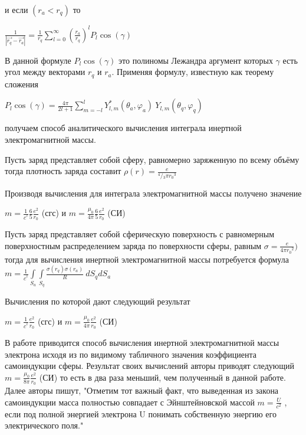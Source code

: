 \documentclass{article}
\begin{document}
и если $\left( {{r}_{a}}<{{r}_{q}} \right)$ то

$\frac{1}{\left| \overrightarrow{{{r}_{q}}}-\overrightarrow{{{r}_{a}}} \right|}=\frac{1}{{{r}_{q}}}\sum\limits_{l=0}^{\infty }{{{\left( \frac{{{r}_{a}}}{{{r}_{q}}} \right)}^{l}}{{P}_{l}} \cos \left( \gamma  \right)}$

В данной формуле ${{P}_{l}} \cos \left( \gamma  \right)$ это полиномы Лежандра аргумент которых $\gamma$ есть угол между векторами ${{r}_{q}}$  и ${{r}_{a}}$. Применяя формулу, известную как теорему сложения

${{P}_{l}}\cos \left( \gamma  \right)=\frac{4\pi }{2l+1}\sum\limits_{m=-l}^{l}{Y_{l,m}^{*}\left( {{\theta }_{a}},{{\varphi }_{a}} \right)}\ {{Y}_{l,m}}\left( {{\theta }_{q}},{{\varphi }_{q}} \right)$

получаем способ аналитического вычисления интеграла инертной электромагнитной массы.

Пусть заряд представляет собой сферу, равномерно заряженную по всему объёму тогда плотность заряда составит $\rho \left( r \right)=\frac{e}{{}^{4}/{}_{3}\pi {{r}_{0}}^{3}}$

Производя вычисления для интеграла электромагнитной массы получено значение 

$m =\frac{1}{{{c}^{^{2}}}}\frac{6}{5}\frac{e^2}{{{r}_{0}}}$ (сгс) и
$m =\frac{{{\mu }_{0}}}{4\pi }\frac{6}{5}\frac{e^2}{{{r}_{0}}}$ (СИ)

Пусть заряд представляет собой сферическую поверхность с равномерным поверхностным распределением заряда по поверхности сферы, равным $\sigma=\frac{e}{4\pi {{r}_{0}}^{2}})$ тогда для вычисления инертной электромагнитной массы потребуется формула
$m=\frac{1}{{{c}^{^{2}}}}\int\limits_{{{S}_{a}}}{\int\limits_{{{S}_{q}}}{\frac{\sigma \left( {{r}_{q}} \right)\sigma \left( {{r}_{a}} \right)}{R}}}\ d{{S}_{q}}d{{S}_{a}}$

Вычисления по которой дают следующий результат

$m =\frac{1}{{{c}^{^{2}}}}\frac{e^2}{{{r}_{0}}}$ (сгс) и
$m =\frac{{{\mu }_{0}}}{4\pi }\frac{e^2}{{{r}_{0}}}$ (СИ)

В работе \cite{misyuchenko} приводится способ вычисления инертной электромагнитной массы электрона исходя из по видимому табличного значения коэффициента самоиндукции сферы. Результат своих вычислений авторы приводят следующий $m =\frac{{{\mu }_{0}}}{8\pi }\frac{e^2}{{{r}_{0}}}$ (СИ) то есть в два раза меньший, чем полученный в данной работе. Далее авторы пишут, "Отметим тот важный факт, что выведенная из закона самоиндукции масса полностью совпадает с Эйнштейновской массой $m=\frac{U}{c^2}$ , если под полной энергией электрона U понимать собственную энергию его электрического поля."
\end{document}
